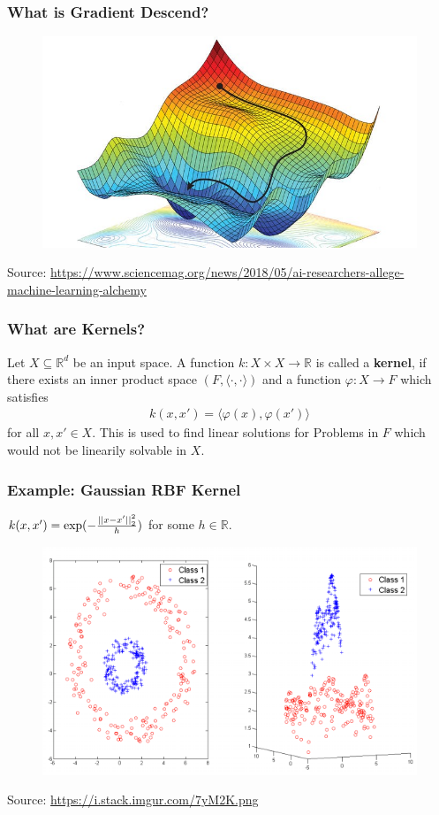 \documentclass[aspectratio=169]{beamer}
\begin{document}
\begin{frame}
    \frametitle{What is Gradient Descend?}
    \begin{figure}
        \includegraphics[width=0.8\linewidth]{gradient_descend.jpeg}
    \end{figure}
    {\tiny \color{gray}  Source: \url{https://www.sciencemag.org/news/2018/05/ai-researchers-allege-machine-learning-alchemy}}
\end{frame}

\begin{frame}
    \frametitle{What are Kernels?}
    Let $X \subseteq \mathbb{R}^d$ be an input space. A function $k:X \times X \rightarrow \mathbb{R}$ is called a \textbf{kernel}, if there exists an inner product space $(F, \langle \cdot, \cdot \rangle)$ and a function $\varphi: X \rightarrow F$ which satisfies
    \begin{align*}
        k(x, x') = \langle \varphi(x), \varphi(x') \rangle
    \end{align*}
    for all $x, x' \in X$. This is used to find linear solutions for Problems in $F$ which would not be linearily solvable in $X$.
\end{frame}

\begin{frame}
    \frametitle{Example: Gaussian RBF Kernel}
     $k(x,x') = \textup{exp}(-\frac{{\vert \vert x-x' \vert \vert}_2^2}{h})$ for some $h \in \mathbb{R}$.
    \begin{figure}
        \includegraphics[width=0.8\linewidth]{rbf_kernel.png}
    \end{figure}
    {\tiny \color{gray}  Source: \url{https://i.stack.imgur.com/7yM2K.png
    }}
\end{frame}
\end{document}
